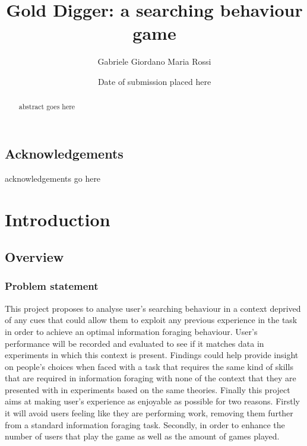\documentclass{mproj}
\begin{document}
\title{Gold Digger: a searching behaviour game}
\author{Gabriele Giordano Maria Rossi}
\date{Date of submission placed here}
\maketitle

\begin{abstract}
abstract goes here
\end{abstract}

\educationalconsent


\newpage
\section*{Acknowledgements}

acknowledgements go here

\tableofcontents
\listoffigures

\chapter{Introduction}\label{intro}

\section{Overview}
\subsection{Problem statement}
This project proposes to analyse user’s searching behaviour in a context deprived of any cues 
that could allow them to exploit any previous experience in the task in order to achieve an 
optimal information foraging behaviour. 
User’s performance will be recorded and evaluated to see if it matches data in experiments in 
which this context is present. Findings could help provide insight on people’s choices when 
faced with a task that requires the same kind of skills that are required in information foraging 
with none of the context that they are presented with in experiments based on the same 
theories.
Finally this project aims at making user’s experience as enjoyable as possible for two reasons.
Firstly it will avoid users feeling like they are performing work, removing them further from a 
standard information foraging task. Secondly, in order to enhance the number of users that 
play the game as well as the amount of games played.
\end{document}
